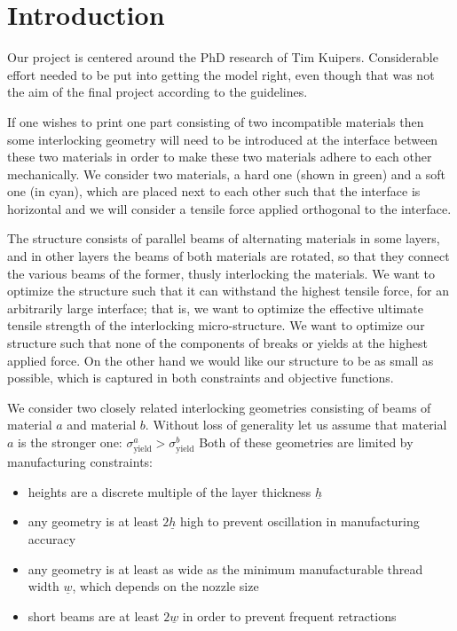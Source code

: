 \section{Introduction}
Our project is centered around the PhD research of Tim Kuipers.
Considerable effort needed to be put into getting the model right, even though that was not the aim of the final project according to the guidelines.

\medskip

If one wishes to print one part consisting of two incompatible materials then some interlocking geometry will need to be introduced at the interface between these two materials in order to make these two materials adhere to each other mechanically.
We consider two materials, a hard one (shown in green) and a soft one (in cyan), which are placed next to each other such that the interface is horizontal
and we will consider a tensile force applied orthogonal to the interface.

The structure consists of parallel beams of alternating materials in some layers, and in other layers the beams of both materials are rotated, so that they connect the various beams of the former, thusly interlocking the materials.
We want to optimize the structure such that it can withstand the highest tensile force, for an arbitrarily large interface;
that is, we want to optimize the effective ultimate tensile strength of the interlocking micro-structure.
We want to optimize our structure such that none of the components of breaks or yields at the highest applied force.
On the other hand we would like our structure to be as small as possible, which is captured in both constraints and objective functions.

\newcommand{\hmin}{\underline{h}}
\newcommand{\wmin}{\underline{w}}
\newcommand{\lmax}{\overline{L}}

We consider two closely related interlocking geometries consisting of beams of material $a$ and material $b$.
Without loss of generality let us assume that material $a$ is the stronger one: $\sigma^a_\text{yield} > \sigma^b_\text{yield} $
Both of these geometries are limited by manufacturing constraints:
\begin{itemize}
	\item heights are a discrete multiple of the layer thickness $\hmin$
	\item any geometry is at least $2\hmin$ high to prevent oscillation in manufacturing accuracy
	\item any geometry is at least as wide as the minimum manufacturable thread width $\wmin$, which depends on the nozzle size
	\item short beams are at least $2\wmin$ in order to prevent frequent retractions
\end{itemize}

